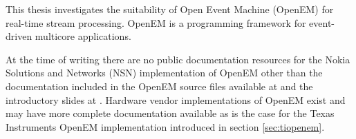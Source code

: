 This thesis investigates the suitability of Open Event Machine (OpenEM) for real-time stream processing. OpenEM is a programming framework for event-driven multicore applications. 

At the time of writing there are no public documentation resources for the Nokia Solutions and Networks (NSN) implementation of OpenEM other than the documentation included in the OpenEM source files available at \cite{openempage} and the introductory slides at \cite{openemintro}. Hardware vendor implementations of OpenEM exist and may have more complete documentation available as is the case for the Texas Instruments OpenEM implementation introduced in section \ref{sec:tiopenem}.

